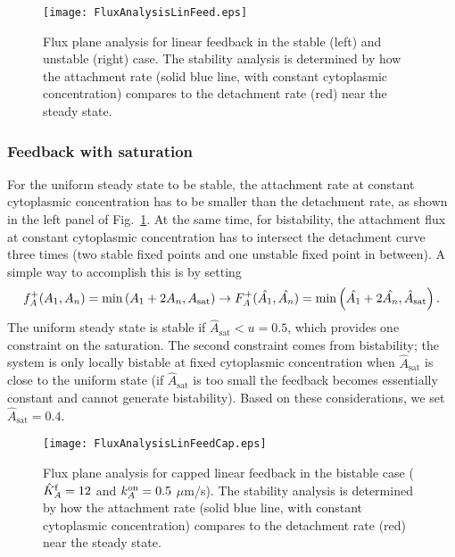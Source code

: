 \documentclass[11pt]{article}
\newcommand{\6}[1]{#1_{\text{6}}}
\newcommand{\3}[1]{#1_{\text{3}}}
\begin{document}
\begin{figure}
\centering
\texttt{[image: FluxAnalysisLinFeed.eps]}
\caption{\label{fig:P3Linear}Flux plane analysis for linear feedback in the stable (left) and unstable (right) case. The stability analysis is determined by how the attachment rate (solid blue line, with constant cytoplasmic concentration) compares to the detachment rate (red) near the steady state.}
\end{figure}

\subsubsection{Feedback with saturation}
For the uniform steady state to be stable, the attachment rate at constant cytoplasmic concentration has to be smaller than the detachment rate, as shown in the left panel of Fig.\ \ref{fig:P3Linear}. At the same time, for bistability, the attachment flux at constant cytoplasmic concentration has to intersect the detachment curve three times (two stable fixed points and one unstable fixed point in between). A simple way to accomplish this is by setting
\begin{equation}
f_A^+(A_1,A_n) =\min\left(A_1+2A_n,A_\text{sat}\right) \rightarrow F_A^+(\hat {A_1}, \hat {A_n}) = \min\left(\hat {A_1}+2\hat {A_n}, \hat A_\text{sat}\right). 
\end{equation}
The uniform steady state is stable if $\hat A_\text{sat} < u = 0.5$, which provides one constraint on the saturation. The second constraint comes from bistability; the system is only locally bistable at fixed cytoplasmic concentration when $\hat A_\text{sat}$ is close to the uniform state (if $\hat A_\text{sat}$ is too small the feedback becomes essentially constant and cannot generate bistability). Based on these considerations, we set $\hat A_\text{sat}=0.4$. 


\begin{figure}
\centering
\texttt{[image: FluxAnalysisLinFeedCap.eps]}
\caption{\label{fig:P3Cap}Flux plane analysis for capped linear feedback in the bistable case ($\hat{K}^\text{f}_A=12$ and $k^\text{on}_A=0.5$ $\mu$m/s). The stability analysis is determined by how the attachment rate (solid blue line, with constant cytoplasmic concentration) compares to the detachment rate (red) near the steady state. }
\end{figure}
\end{document}
